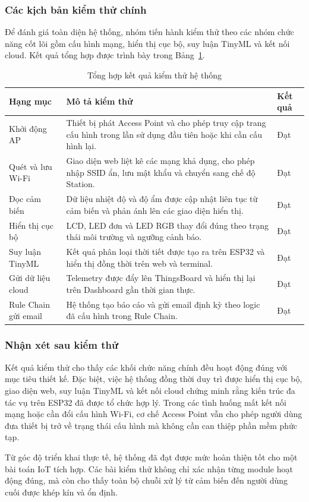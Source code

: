 \subsubsection{Các kịch bản kiểm thử chính}
Để đánh giá toàn diện hệ thống, nhóm tiến hành kiểm thử theo các nhóm chức năng cốt lõi gồm cấu hình mạng, hiển thị cục bộ, suy luận TinyML và kết nối cloud. Kết quả tổng hợp được trình bày trong Bảng~\ref{tab:test-result-summary}.

\begin{table}[H]
    \centering
    \caption{Tổng hợp kết quả kiểm thử hệ thống}
    \label{tab:test-result-summary}
    \renewcommand{\arraystretch}{1.35}
    \begin{tabularx}{\textwidth}{|>{\raggedright\arraybackslash}p{3.2cm}|>{\raggedright\arraybackslash}X|>{\centering\arraybackslash}p{2.3cm}|}
        \hline
        \textbf{Hạng mục} & \textbf{Mô tả kiểm thử} & \textbf{Kết quả} \\ \hline
        Khởi động AP & Thiết bị phát Access Point và cho phép truy cập trang cấu hình trong lần sử dụng đầu tiên hoặc khi cần cấu hình lại. & Đạt \\ \hline
        Quét và lưu Wi-Fi & Giao diện web liệt kê các mạng khả dụng, cho phép nhập SSID ẩn, lưu mật khẩu và chuyển sang chế độ Station. & Đạt \\ \hline
        Đọc cảm biến & Dữ liệu nhiệt độ và độ ẩm được cập nhật liên tục từ cảm biến và phản ánh lên các giao diện hiển thị. & Đạt \\ \hline
        Hiển thị cục bộ & LCD, LED đơn và LED RGB thay đổi đúng theo trạng thái môi trường và ngưỡng cảnh báo. & Đạt \\ \hline
        Suy luận TinyML & Kết quả phân loại thời tiết được tạo ra trên ESP32 và hiển thị đồng thời trên web và terminal. & Đạt \\ \hline
        Gửi dữ liệu cloud & Telemetry được đẩy lên ThingsBoard và hiển thị lại trên Dashboard gần thời gian thực. & Đạt \\ \hline
        Rule Chain gửi email & Hệ thống tạo báo cáo và gửi email định kỳ theo logic đã cấu hình trong Rule Chain. & Đạt \\ \hline
    \end{tabularx}
\end{table}

\subsubsection{Nhận xét sau kiểm thử}
Kết quả kiểm thử cho thấy các khối chức năng chính đều hoạt động đúng với mục tiêu thiết kế. Đặc biệt, việc hệ thống đồng thời duy trì được hiển thị cục bộ, giao diện web, suy luận TinyML và kết nối cloud chứng minh rằng kiến trúc đa tác vụ trên ESP32 đã được tổ chức hợp lý. Trong các tình huống mất kết nối mạng hoặc cần đổi cấu hình Wi-Fi, cơ chế Access Point vẫn cho phép người dùng đưa thiết bị trở về trạng thái cấu hình mà không cần can thiệp phần mềm phức tạp.

Từ góc độ triển khai thực tế, hệ thống đã đạt được mức hoàn thiện tốt cho một bài toán IoT tích hợp. Các bài kiểm thử không chỉ xác nhận từng module hoạt động đúng, mà còn cho thấy toàn bộ chuỗi xử lý từ cảm biến đến người dùng cuối được khép kín và ổn định.